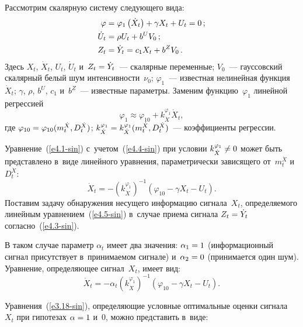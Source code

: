 \begin{multicols}{2}
Рассмотрим скалярную систему сле\-ду\-юще\-го \mbox{вида}:
    \begin{align}
    \varphi&=\varphi_1\left(\dot X_t\right)+\gamma X_t+U_t =0\,;\label{e4.1-sin}\\
     \dot U_t &= \rho U_t + b^U V_0\,;\notag %
     \\
     Z_t &= \dot Y_t = c_1 X_t + b^Z V_0\,.\label{e4.3-sin}
     \end{align}
Здесь $X_t$, $\dot X_t$, $U_t$, $\dot U_t$ и~$Z_t \hm=\dot Y_t$~--- скалярные переменные; $V_0$~--- 
гауссовский  скалярный белый шум интенсивности~$\nu_0$; $\varphi_1$~--- 
известная нелинейная функция~$\dot X_t$; $\gamma$, $\rho$, $b^U$, $c_1$ и~$b^Z$~--- 
известные параметры. Заменим функцию~$\varphi_1$ линейной регрессией
 \begin{equation}
 \varphi_1 \approx \varphi_{10} + k_{\dot X}^{\varphi_1} \dot X_t,
 \label{e4.4-sin}
 \end{equation}
где $\varphi_{10}\hm=\varphi_{10}( m_t^{\dot X}, D_t^{\dot X})$; 
$k_{\dot X}^{\varphi_1}\hm = k_{\dot X}^{\varphi_1} (m_t^{\dot X}, D_t^{\dot X})$~--- коэффициенты 
регрессии.

Уравнение~(\ref{e4.1-sin}) с~учетом~(\ref{e4.4-sin}) 
при условии $k_{\dot X}^{\varphi_1}\hm\ne 0$ может быть представлено в~виде линейного уравнения, 
параметрически зависящего от~$m_t^{\dot X}$ и~$D_t^{\dot X}$:
 \begin{equation}
 \dot X_t =-\left( k_{\dot X}^{\varphi_1}\right)^{-1}\left(\varphi_{10} -\gamma X_t - U_t\right).
 \label{e4.5-sin}
 \end{equation}
Поставим задачу обнаружения несущего информацию сигнала~$X_t$, определяемого линейным уравнением~(\ref{e4.5-sin}) 
в~случае приема сигнала $Z_t \hm=\dot Y_t$ согласно~(\ref{e4.3-sin}).

В таком случае параметр  $\alpha_t$ имеет два значения: $\alpha_1 \hm=1$ (информационный сигнал 
присутствует в~принимаемом сигнале) и~$\alpha_2 \hm=0$ (принимается один шум). 
Уравнение, определяющее сигнал~$X_t$, имеет вид:
    $$
    \dot X_t = - \alpha_t \left(k_{\dot X}^{\varphi_1}\right)^{-1} \left(\varphi_{10} - \gamma X_t-U_t\right).
    $$

Уравнения~(\ref{e3.18-sin}), определяющие условные оптимальные оценки сигнала~$X_t$ при 
гипотезах $\alpha\hm=1$  и~$0$, можно представить в~виде:


\end{multicols}
